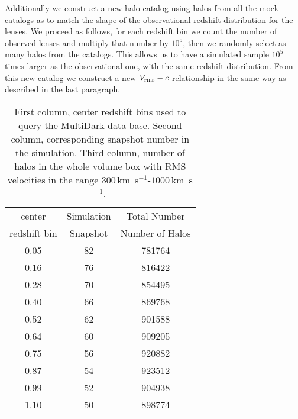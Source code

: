 \documentclass{article}
\newcommand{\kms}{\,km~s$^{-1}$}
\begin{document}
Additionally we construct a new halo catalog using halos from all the
mock catalogs as to match the shape of the observational redshift
distribution for the lenses. We proceed as follows, for each redshift
bin we count the number of observed lenses and multiply that number by
$10^5$, then we randomly select as many halos from the catalogs. This
allows us to have a simulated sample $10^5$ times larger as the
observational one, with the same redshift distribution. From this new
catalog we construct a new $V_{\rm rms}-c$ relationship in the same
way as described in the last paragraph.

\begin{table}
\begin{tabular}{ccc}
center & Simulation & Total Number \\
redshift bin & Snapshot & Number of Halos\\
0.05 & 82 & 781764\\
0.16 & 76 & 816422\\
0.28 & 70 & 854495\\
0.40 & 66 & 869768\\
0.52 & 62 & 901588\\
0.64 & 60 & 909205\\
0.75 & 56 & 920882\\
0.87 & 54 & 923512\\
0.99 & 52 & 904938\\
1.10 & 50 & 898774\\
\end{tabular}
\caption{First column, center redshift bins used to query the MultiDark data
  base. Second column, corresponding snapshot number in the
  simulation. Third column, number of halos in the whole volume box
  with RMS velocities in the range $300$\kms-$1000$\kms.}
\end{table}





\end{document}

